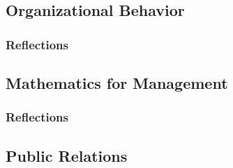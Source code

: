 \documentclass[12pt,titlepage]{article}
\begin{document}

\restoregeometry



\subsection{Organizational Behavior}
\subsubsection{Reflections}


\restoregeometry




\subsection{Mathematics for Management}
\subsubsection{Reflections}


\restoregeometry


\subsection{Public Relations}
\end{document}
